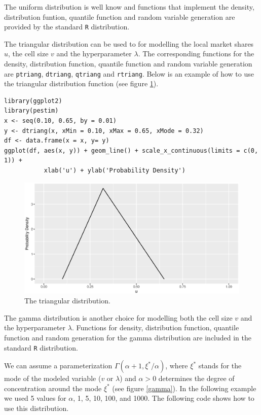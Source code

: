 \documentclass[12pt, a4paper]{article}
\begin{document}
The uniform distribution is well know and functions that implement the density, distribution funtion, 
quantile function and random variable generation are provided by the standard \texttt{R} distribution.

The triangular distribution can be used to for modelling the local market shares $u$, 
the cell size $v$ and the hyperparameter $\lambda$. The corresponding functions for 
the density, distribution function, quantile function and random variable generation
are \texttt{ptriang}, \texttt{dtriang}, \texttt{qtriang} and \texttt{rtriang}.
Below is an example of how to use the triangular distribution function (see figure \ref{triang}).

\begin{verbatim}
library(ggplot2)
library(pestim)
x <- seq(0.10, 0.65, by = 0.01)
y <- dtriang(x, xMin = 0.10, xMax = 0.65, xMode = 0.32)
df <- data.frame(x = x, y= y)
ggplot(df, aes(x, y)) + geom_line() + scale_x_continuous(limits = c(0, 1)) + 
           xlab('u') + ylab('Probability Density')	
\end{verbatim}

\begin{figure}
	\centering
	\includegraphics[scale=0.75]{triang.eps}
	\caption{The triangular distribution.}
	\label{triang}
\end{figure}

The gamma distribution is another choice for modelling both the cell size $v$ and the hyperparameter $\lambda$.
Functions for density, distribution function, quantile function and random generation for the gamma distribution  are included in the standard \texttt{R} distribution.

We can assume a parameterization $\Gamma(\alpha + 1, \xi^{*} / \alpha)$, where $\xi^{*}$ stands for the mode of the 
modeled variable ($v$ or $\lambda$) and $\alpha> 0$ determines the degree of concentration 
around the mode $\xi^{*}$ (see figure \ref{gamma}). In the following example we used 5 values for 
$\alpha$, 1, 5, 10, 100, and 1000. The following code shows how to use this distribution.
\end{document}
